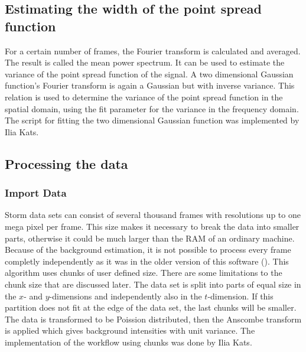 \subsection{Estimating the width of the point spread function}
For a certain number of frames, the Fourier transform is calculated and averaged. The result is called the mean power spectrum. It can be used to estimate the variance of the point spread function of the signal. A two dimensional Gaussian function's Fourier transform is again a Gaussian but with inverse variance. This relation is used to determine the variance of the point spread function in the spatial domain, using the fit parameter for the variance in the frequency domain.\newline
The script for fitting the two dimensional Gaussian function was implemented by Ilia Kats.
\subsection{Processing the data}
\subsubsection{Import Data}
Storm data sets can consist of several thousand frames with resolutions up to one mega pixel per frame. This size makes it necessary to break the data into smaller parts, otherwise it could be much larger than the RAM of an ordinary machine. Because of the background estimation, it is not possible to process every frame completly independently as it was in the older version of this software (\cite{MAJoachim}). 
\newline
This algorithm uses chunks of user defined size. There are some limitations to the chunk size that are discussed later. The data set is split into parts of equal size in the $x$- and $y$-dimensions and independently also in the $t$-dimension. If this partition does not fit at the edge of the data set, the last chunks will be smaller.\newline
The data is transformed to be Poission distributed, then the Anscombe transform is applied which gives background intensities with unit variance.\newline
The implementation of the workflow using chunks was done by Ilia Kats.
